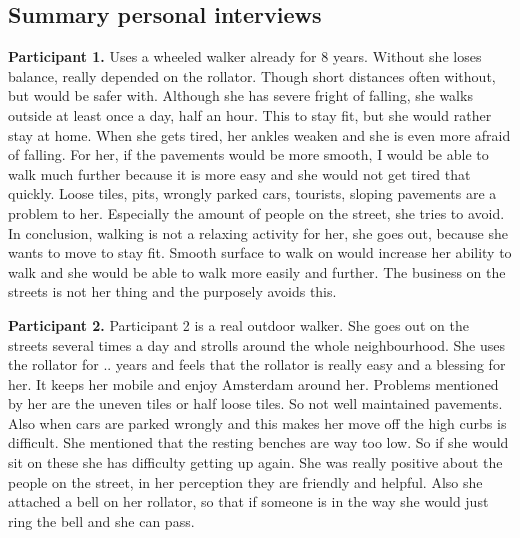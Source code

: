 





\clearpage

\subsection{Summary personal interviews}

\textbf{Participant 1.}
Uses a wheeled walker already for 8 years. Without she loses balance, really depended on the rollator. Though short distances often without, but would be safer with. Although she has severe fright of falling, she walks outside at least once a day, half an hour. This to stay fit, but she would rather stay at home. When she gets tired, her ankles weaken and she is even more afraid of falling. 
For her, if the pavements would be more smooth, I would be able to walk much further because it is more easy and she would not get tired that quickly. Loose tiles, pits, wrongly parked cars, tourists, sloping pavements are a problem to her. Especially the amount of people on the street, she tries to avoid. 
In conclusion, walking is not a relaxing activity for her, she goes out, because she wants to move to stay fit. Smooth surface to walk on would increase her ability to walk and she would be able to walk more easily and further. The business on the streets is not her thing and the purposely avoids this. 

\textbf{Participant 2. }
Participant 2 is a real outdoor walker. She goes out on the streets several times a day and strolls around the whole neighbourhood. She uses the rollator for .. years and feels that the rollator is really easy and a blessing for her. It keeps her mobile and enjoy Amsterdam around her. 
Problems mentioned by her are the uneven tiles or half loose tiles. So not well maintained pavements. Also when cars are parked wrongly and this makes her move off the high curbs is difficult. 
She mentioned that the resting benches are way too low. So if she would sit on these she has difficulty getting up again. 
She was really positive about the people on the street, in her perception they are friendly and helpful. Also she attached a bell on her rollator, so that if someone is in the way she would just ring the bell and she can pass. 

